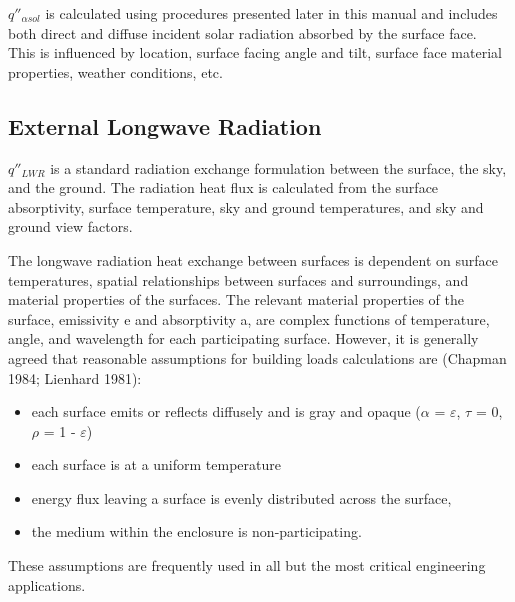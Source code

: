 \(q''_{\alpha sol}\) is calculated using procedures presented later in this manual and includes both direct and diffuse incident solar radiation absorbed by the surface face.~ This is influenced by location, surface facing angle and tilt, surface face material properties, weather conditions, etc.

\subsection{External Longwave Radiation}\label{external-longwave-radiation}

\({q''_{LWR}}\) is a standard radiation exchange formulation between the surface, the sky, and the ground. The radiation heat flux is calculated from the surface absorptivity, surface temperature, sky and ground temperatures, and sky and ground view factors.

The longwave radiation heat exchange between surfaces is dependent on surface temperatures, spatial relationships between surfaces and surroundings, and material properties of the surfaces. The relevant material properties of the surface, emissivity e and absorptivity a, are complex functions of temperature, angle, and wavelength for each participating surface. However, it is generally agreed that reasonable assumptions for building loads calculations are (Chapman 1984; Lienhard 1981):

\begin{itemize}
\item
  each surface emits or reflects diffusely and is gray and opaque ($\alpha$ = $\varepsilon$, $\tau$ = 0, $\rho$ = 1 - $\varepsilon$)
\item
  each surface is at a uniform temperature
\item
  energy flux leaving a surface is evenly distributed across the surface,
\item
  the medium within the enclosure is non-participating.
\end{itemize}

These assumptions are frequently used in all but the most critical engineering applications.

